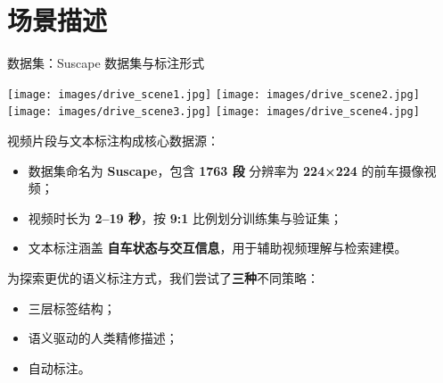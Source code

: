 \documentclass[serif]{beamer}
\begin{document}
\section{场景描述}

\begin{frame}{数据集：Suscape 数据集与标注形式}

\begin{center}
\texttt{[image: images/drive\_scene1.jpg]}
\hfill
\texttt{[image: images/drive\_scene2.jpg]}
\hfill
\texttt{[image: images/drive\_scene3.jpg]}
\hfill
\texttt{[image: images/drive\_scene4.jpg]}
\end{center}

\vspace{0.2em}

\begin{flushleft}
视频片段与文本标注构成核心数据源：

\begin{itemize}
  \item 数据集命名为 \textbf{Suscape}，包含 \textbf{1763 段} 分辨率为 \textbf{224×224} 的前车摄像视频；
  \item 视频时长为 \textbf{2–19 秒}，按 \textbf{9:1} 比例划分训练集与验证集；
  \item 文本标注涵盖 \textbf{自车状态与交互信息}，用于辅助视频理解与检索建模。
\end{itemize}

\vspace{0.3em}

为探索更优的语义标注方式，我们尝试了\textbf{三种}不同策略：

\begin{itemize}
  \item 三层标签结构；
  \item 语义驱动的人类精修描述；
  \item 自动标注。
\end{itemize}
\end{flushleft}

\end{frame}
\end{document}
